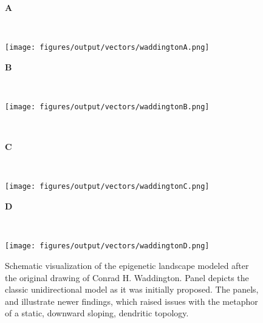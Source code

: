  \begin{figure}[tbh]
 	\begin{minipage}{0.5\textwidth}
 		{\raggedright{\huge\bfseries \color{fbbioblue} A}\hspace{1em}{\Large Classic model}}\vspace{1em}\\
 		\begin{center}
 			\texttt{[image: figures/output/vectors/waddingtonA.png]} 
 		\end{center}
 	\end{minipage}
 	\begin{minipage}{0.5\textwidth}
	 {\raggedright{\huge\bfseries \color{fbbioblue} B}\hspace{1em}{\Large Reprogramming}}\vspace{1em}\\
	 \begin{center}
	 	 \texttt{[image: figures/output/vectors/waddingtonB.png]} 
	 \end{center}
 	\end{minipage} \vspace{3em} \\
 	\begin{minipage}{0.5\textwidth}
 		{\raggedright{\huge\bfseries \color{fbbioblue} C}\hspace{1em}{\Large Trans-differentiation}}\vspace{1em}\\
 		\begin{center}
 			\texttt{[image: figures/output/vectors/waddingtonC.png]} 
 		\end{center}
 	\end{minipage}
 	 	\begin{minipage}{0.5\textwidth}
 	 		{\raggedright{\huge\bfseries \color{fbbioblue} D}\hspace{1em}{\Large Primed gradual transitions}}\vspace{1em}\\
 	 		\begin{center}
 	 			\texttt{[image: figures/output/vectors/waddingtonD.png]} \vspace{1em}\\
 	 		\end{center}
 	 	\end{minipage}
 	\caption{Schematic visualization of the epigenetic landscape modeled after the original drawing of Conrad H. Waddington. Panel depicts the classic unidirectional model as it was initially proposed. The panels,   and  illustrate newer findings, which raised issues with the metaphor of a static, downward sloping, dendritic topology.}
 	\label{fig:waddingtonrefined}
 \end{figure}

